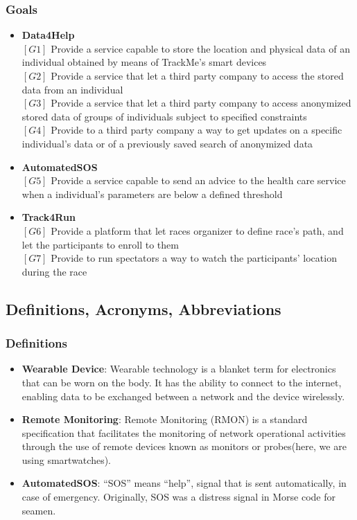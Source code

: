 \documentclass[12pt]{article}
\begin{document}
\subsubsection{Goals}
\begin{itemize}
\item{\textbf{Data4Help}}\\
$[G1]$ Provide a service capable to store the location and physical data of an individual obtained by means of TrackMe's smart devices\\
$[G2]$ Provide a service that let a third party company to access the stored data from an individual\\
$[G3]$ Provide a service that let a third party company to access anonymized stored data of groups of individuals subject to specified constraints\\
$[G4]$ Provide to a third party company a way to get updates on a specific individual's data or of a previously saved search of anonymized data\\
 \item{\textbf{AutomatedSOS}}\\
$[G5]$ Provide a service capable to send an advice to the health care service when a individual's parameters are below a defined threshold\\
 \item{\textbf{Track4Run}}\\
$[G6]$ Provide a platform that let races organizer to define race's path, and let the participants to enroll to them\\
$[G7]$ Provide to run spectators a way to watch the participants' location during the race\\
\end{itemize}

\subsection{Definitions, Acronyms, Abbreviations}
\subsubsection{Definitions}
\begin{itemize}
\item{} \textbf{Wearable Device}: Wearable technology is a blanket term for electronics that can be worn on the body. It has the ability to connect to the internet, enabling data to be exchanged between a network and the device wirelessly.

\item{} \textbf{Remote Monitoring}: Remote Monitoring (RMON) is a standard specification that facilitates the monitoring of network operational activities through the use of remote devices known as monitors or probes(here, we are using smartwatches).

\item{} \textbf{AutomatedSOS}: “SOS” means “help”, signal that is sent automatically, in case of emergency. Originally, SOS was a distress signal in Morse code for seamen.

\end{itemize}
\end{document}
